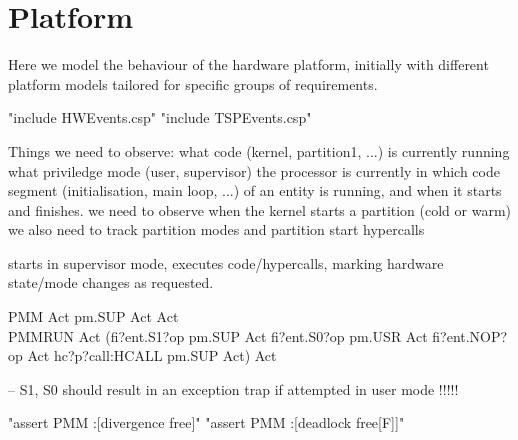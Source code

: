 \section{Platform}

 Here we model the behaviour of the hardware platform, initially with different
 platform models tailored for specific groups of requirements.
%
\begin{assert}
"include HWEvents.csp"
\also
"include TSPEvents.csp"
\end{assert}


Things we need to observe:
  what code (kernel, partition1, ...) is currently running
  what priviledge mode (user, supervisor) the processor is currently in
  which code segment (initialisation, main loop, ...) of an entity is running,
    and when it starts and finishes.
  we need to observe when the kernel starts a partition (cold or warm)
  we also need to track partition modes and partition start hypercalls

starts in supervisor mode, executes code/hypercalls,
marking hardware state/mode changes as requested.
\begin{circus}
\circprocess PMM \circdef \circbegin Act \circdef pm.SUP \then Act \circspot Act \circend\\

\circprocess PMMRUN \circdef
\circbegin
  Act \circdef (fi?ent.S1?op \then pm.SUP \then Act
   \extchoice
   fi?ent.S0?op \then pm.USR \then Act
   \extchoice
   fi?ent.NOP?op \then Act
   \extchoice
   hc?p?call:HCALL \then pm.SUP \then Act)
   \circspot Act
\circend
\end{circus}
-- S1, S0 should result in an exception trap if attempted in user mode !!!!!

\begin{assert}
"assert PMM :[divergence free]"
\also "assert PMM :[deadlock free[F]]"
\end{assert}
